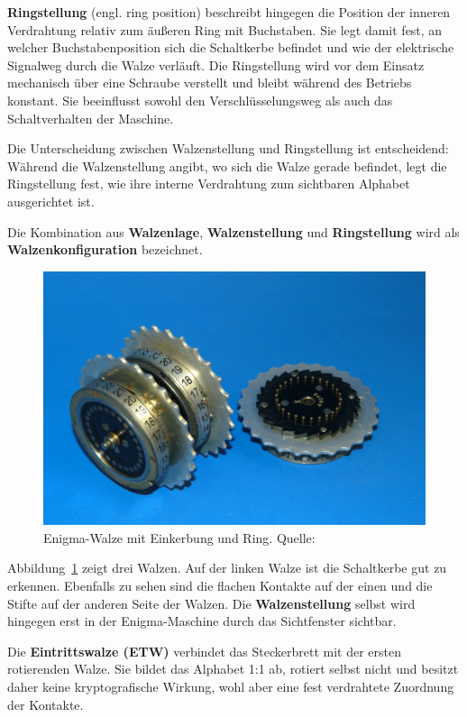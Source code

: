 \documentclass[12pt, ngerman, a4paper, numbers=noenddot]{article}
\begin{document}
\textbf{Ringstellung} (engl. ring position) beschreibt hingegen die Position der inneren Verdrahtung relativ zum äußeren Ring mit Buchstaben. Sie legt damit fest, an welcher Buchstabenposition sich die Schaltkerbe befindet und wie der elektrische Signalweg durch die Walze verläuft. Die Ringstellung wird vor dem Einsatz mechanisch über eine Schraube verstellt und bleibt während des Betriebs konstant. Sie beeinflusst sowohl den Verschlüsselungsweg als auch das Schaltverhalten der Maschine.

Die Unterscheidung zwischen Walzenstellung und Ringstellung ist entscheidend: Während die Walzenstellung angibt, wo sich die Walze gerade befindet, legt die Ringstellung fest, wie ihre interne Verdrahtung zum sichtbaren Alphabet ausgerichtet ist.

Die Kombination aus \textbf{Walzenlage}, \textbf{Walzenstellung} und \textbf{Ringstellung} wird als \textbf{Walzenkonfiguration} bezeichnet.

\begin{figure}[H]
	\centering
	\includegraphics[width=1\textwidth]{bilder/Enigma_rotor.jpg}
	\caption{Enigma-Walze mit Einkerbung und Ring. Quelle: \cite{wiki:enigma_walzen}}
	\label{fig:Explosionsansicht}
\end{figure}

Abbildung~\ref{fig:Explosionsansicht} zeigt drei Walzen. Auf der linken Walze ist die Schaltkerbe gut zu erkennen. Ebenfalls zu sehen sind die flachen Kontakte auf der einen und die Stifte auf der anderen Seite der Walzen. Die \textbf{Walzenstellung} selbst wird hingegen erst in der Enigma-Maschine durch das Sichtfenster sichtbar.

Die \textbf{Eintrittswalze (ETW)} verbindet das Steckerbrett mit der ersten rotierenden Walze. Sie bildet das Alphabet 1:1 ab, rotiert selbst nicht und besitzt daher keine kryptografische Wirkung, wohl aber eine fest verdrahtete Zuordnung der Kontakte.
\end{document}
